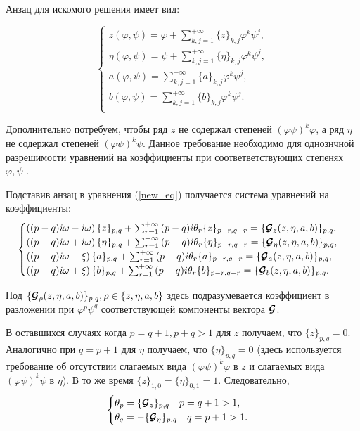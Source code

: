 Анзац для искомого решения имеет вид:

\begin{equation}
\begin{cases}
z(\varphi,\psi) = \varphi + \sum_{k,j=1}^{+\infty}{ \{z\}_{k,j} \varphi^k \psi^j },\\
\eta(\varphi,\psi) = \psi + \sum_{k,j=1}^{+\infty}{ \{\eta\}_{k,j} \varphi^k \psi^j },\\
a(\varphi,\psi) = \sum_{k,j=1}^{+\infty}{ \{a\}_{k,j} \varphi^k \psi^j },\\
b(\varphi,\psi) = \sum_{k,j=1}^{+\infty}{ \{b\}_{k,j} \varphi^k \psi^j }.\\
\end{cases}
\label{predst3}
\end{equation}

Дополнительно потребуем, чтобы ряд $z$ не содержал степеней $(\varphi \psi)^k \varphi$, а ряд $\eta$ не содержал степеней $(\varphi \psi)^k \psi$. Данное требование необходимо для однознчной разрешимости уравнений на коэффициенты при соответветствующих степенях $\varphi,\psi$ \cite{siegel}. 

Подставив анзац в уравнения (\ref{new_eq}) получается система уравнений на коэффициенты:
\begin{equation}
\begin{cases}
\left((p-q)i\omega - i\omega \right)\{z\}_{p,q} + \sum_{r=1}^{+\infty}{(p-q)i\theta_r \{z\}_{p-r,q-r}} = \{\boldsymbol{\mathcal{G}}_z(z,\eta,a,b)\}_{p,q}, \\
\left((p-q)i\omega + i\omega \right)\{\eta\}_{p,q} + \sum_{r=1}^{+\infty}{(p-q)i\theta_r \{\eta\}_{p-r,q-r}} = \{\boldsymbol{\mathcal{G}}_\eta(z,\eta,a,b)\}_{p,q}, \\
\left((p-q)i\omega - \xi \right)\{a\}_{p,q} + \sum_{r=1}^{+\infty}{(p-q)i\theta_r \{a\}_{p-r,q-r}} = \{\boldsymbol{\mathcal{G}}_a(z,\eta,a,b)\}_{p,q}, \\
\left((p-q)i\omega + \xi \right)\{b\}_{p,q} + \sum_{r=1}^{+\infty}{(p-q)i\theta_r \{b\}_{p-r,q-r}} = \{\boldsymbol{\mathcal{G}}_b(z,\eta,a,b)\}_{p,q}. \\
\end{cases}
\label{pq_eq}
\end{equation}

Под $\{\boldsymbol{\mathcal{G}}_\rho(z,\eta,a,b)\}_{p,q}, \rho \in \{z,\eta,a,b\}$ здесь подразумевается коэффициент в разложении при $\varphi^p \psi^q$ соответствующей компоненты вектора $\boldsymbol{\mathcal{G}}$.

В оставшихся случаях когда $p=q+1, p+q>1$ для $z$ получаем, что $\{z\}_{p,q}=0$. Аналогично при $q=p+1$ для $\eta$ получаем, что $\{\eta\}_{p,q}=0$ (здесь используется требование об отсутствии слагаемых вида $(\varphi \psi)^k \varphi$ в $z$ и слагаемых вида $(\varphi \psi)^k \psi$ в $\eta$). В то же время $\{z\}_{1,0} = \{\eta\}_{0,1} = 1$. Следовательно,
\begin{equation*}
\begin{cases}
\theta_p = \{ \boldsymbol{\mathcal{G}}_z\}_{p,q} \quad p=q+1>1, \\
\theta_q = - \{ \boldsymbol{\mathcal{G}}_\eta \}_{p,q} \quad q=p+1>1.
\end{cases}
\end{equation*}


